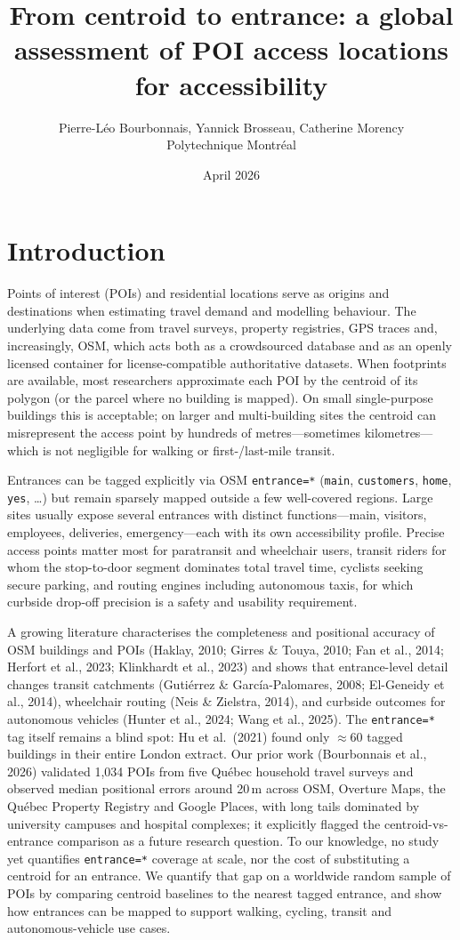 \documentclass{article}
\title{From centroid to entrance: a global assessment of POI access locations for accessibility}
\author{Pierre-Léo Bourbonnais, Yannick Brosseau, Catherine Morency \\
        Polytechnique Montréal}
\date{April 2026}
\begin{document}
\maketitle

\section{Introduction}

Points of interest (POIs) and residential locations serve as origins and destinations
when estimating travel demand and modelling behaviour. The
underlying data come from travel surveys, property registries,
GPS traces and, increasingly, OSM, which acts both as a
crowdsourced database and as an openly licensed container for
license-compatible authoritative datasets. When footprints are
available, most researchers approximate each POI by the centroid
of its polygon (or the parcel where no building is mapped). On
small single-purpose buildings this is acceptable; on larger and
multi-building sites the centroid can misrepresent the access
point by hundreds of metres---sometimes kilometres---which is not
negligible for walking or first-/last-mile transit.

Entrances can be tagged explicitly via OSM \texttt{entrance=*}
(\texttt{main}, \texttt{customers}, \texttt{home}, \texttt{yes},
\ldots) but remain sparsely mapped outside a few well-covered
regions. Large sites usually expose several entrances with
distinct functions---main, visitors, employees, deliveries,
emergency---each with its own accessibility profile. Precise
access points matter most for paratransit and wheelchair users,
transit riders for whom the stop-to-door segment dominates total
travel time, cyclists seeking secure parking, and routing engines
including autonomous taxis, for which curbside drop-off precision
is a safety and usability requirement.

A growing literature characterises the completeness and
positional accuracy of OSM buildings and POIs (Haklay, 2010;
Girres \& Touya, 2010; Fan et al., 2014; Herfort et al., 2023;
Klinkhardt et al., 2023) and shows that entrance-level detail
changes transit catchments (Gutiérrez \& García-Palomares,
2008; El-Geneidy et al., 2014), wheelchair routing (Neis \&
Zielstra, 2014), and curbside outcomes for autonomous vehicles
(Hunter et al., 2024; Wang et al., 2025). The \texttt{entrance=*}
tag itself remains a blind spot: Hu et al.\ (2021) found only
\(\approx\)60 tagged buildings in their entire London extract.
Our prior work (Bourbonnais et al., 2026) validated 1{,}034 POIs
from five Québec household travel surveys and observed median
positional errors around 20\,m across OSM, Overture Maps, the
Québec Property Registry and Google Places, with long tails
dominated by university campuses and hospital complexes; it
explicitly flagged the centroid-vs-entrance comparison as a 
future research question.
To our knowledge, no study yet quantifies \texttt{entrance=*}
coverage at scale, nor the cost of substituting a centroid for
an entrance. We quantify that gap on a worldwide random sample
of POIs by comparing centroid baselines to the nearest tagged
entrance, and show how entrances can be mapped to support
walking, cycling, transit and autonomous-vehicle use cases.
\end{document}
